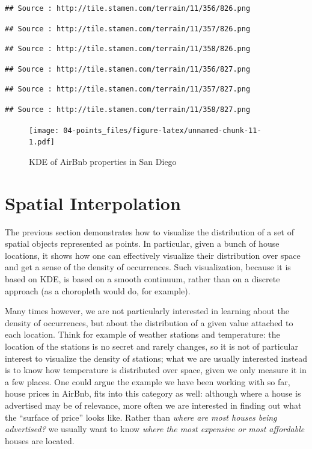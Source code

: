 \documentclass[
]{book}
\begin{document}
\begin{verbatim}
## Source : http://tile.stamen.com/terrain/11/356/826.png
\end{verbatim}

\begin{verbatim}
## Source : http://tile.stamen.com/terrain/11/357/826.png
\end{verbatim}

\begin{verbatim}
## Source : http://tile.stamen.com/terrain/11/358/826.png
\end{verbatim}

\begin{verbatim}
## Source : http://tile.stamen.com/terrain/11/356/827.png
\end{verbatim}

\begin{verbatim}
## Source : http://tile.stamen.com/terrain/11/357/827.png
\end{verbatim}

\begin{verbatim}
## Source : http://tile.stamen.com/terrain/11/358/827.png
\end{verbatim}

\begin{figure}
\centering
\texttt{[image: 04-points\_files/figure-latex/unnamed-chunk-11-1.pdf]}
\caption{\label{fig:unnamed-chunk-11}KDE of AirBnb properties in San Diego}
\end{figure}

\hypertarget{spatial-interpolation}{%
\section{Spatial Interpolation}\label{spatial-interpolation}}

The previous section demonstrates how to visualize the distribution of a set of spatial objects represented as points. In particular, given a bunch of house locations, it shows how one can effectively visualize their distribution over space and get a sense of the density of occurrences. Such visualization, because it is based on KDE, is based on a smooth continuum, rather than on a discrete approach (as a choropleth would do, for example).

Many times however, we are not particularly interested in learning about the density of occurrences, but about the distribution of a given value attached to each location. Think for example of weather stations and temperature: the location of the stations is no secret and rarely changes, so it is not of particular interest to visualize the density of stations; what we are usually interested instead is to know how temperature is distributed over space, given we only measure it in a few places. One could argue the example we have been working with so far, house prices in AirBnb, fits into this category as well: although where a house is advertised may be of relevance, more often we are interested in finding out what the ``surface of price'' looks like. Rather than \emph{where are most houses being advertised?} we usually want to know \emph{where the most expensive or most affordable} houses are located.
\end{document}
